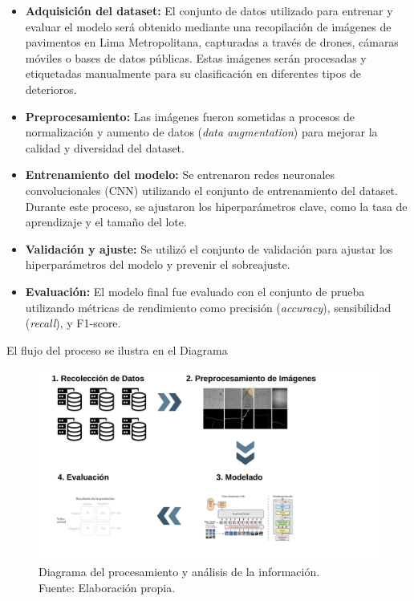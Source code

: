 \begin{itemize}
	\item \textbf{Adquisición del dataset:} El conjunto de datos utilizado para entrenar y evaluar el modelo será obtenido mediante una recopilación de imágenes de pavimentos en Lima Metropolitana, capturadas a través de drones, cámaras móviles o bases de datos públicas. Estas imágenes serán procesadas y etiquetadas manualmente para su clasificación en diferentes tipos de deterioros.
	\item \textbf{Preprocesamiento:} Las imágenes fueron sometidas a procesos de normalización y aumento de datos (\textit{data augmentation}) para mejorar la calidad y diversidad del dataset.
    \item \textbf{Entrenamiento del modelo:} Se entrenaron redes neuronales convolucionales (CNN) utilizando el conjunto de entrenamiento del dataset. Durante este proceso, se ajustaron los hiperparámetros clave, como la tasa de aprendizaje y el tamaño del lote.
    \item \textbf{Validación y ajuste:} Se utilizó el conjunto de validación para ajustar los hiperparámetros del modelo y prevenir el sobreajuste.
    \item \textbf{Evaluación:} El modelo final fue evaluado con el conjunto de prueba utilizando métricas de rendimiento como precisión (\textit{accuracy}), sensibilidad (\textit{recall}), y F1-score.
\end{itemize}

El flujo del proceso se ilustra en el Diagrama %

\begin{figure}[H]
	\begin{center}
		\includegraphics[width=1.00\textwidth]{2/figures/diagrama.png}
		\caption[Diagrama del procesamiento y análisis de la información]{Diagrama del procesamiento y análisis de la información. \\
		Fuente: Elaboración propia.}
	\end{center}
\end{figure}






